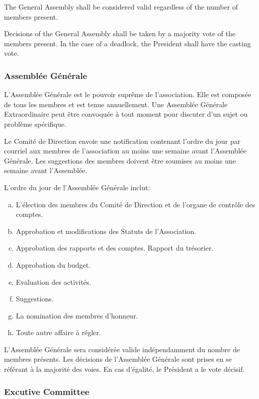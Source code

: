 \documentclass[12pt,a4paper,oneside]{article}
\newcounter{art}
\newcommand{\english}{    \switchcolumn[0]\noindent}
\newcommand{\french}{    \switchcolumn[1]\noindent}
\begin{document}
\begin{paracol}{2}
	The General Assembly shall be considered valid regardless of the number of members present.

	Decisions of the General Assembly shall be taken by a majority vote of the members present. In the case of a deadlock, the President shall have the casting vote.

	\french
	\subsubsection{Assemblée Générale}

	L'Assemblée Générale est le pouvoir suprême de l'association. Elle est composée de tous les membres et est tenue annuellement. Une Assemblée Générale Extraordinaire peut être convoquée à tout moment pour discuter d'un sujet ou problème spécifique.
 
	Le Comité de Direction envoie une notification contenant l’ordre du jour par courriel aux membres de l’association au moins une semaine avant l’Assemblée Générale. Les suggestions des membres doivent être soumises au moins une semaine avant l’Assemblée. 

	L’ordre du jour de l’Assemblée Générale inclut:
	\begin{enumerate}[(a)]
		\item L’élection des membres du Comité de Direction et de l’organe de contrôle des comptes.
		\item Approbation et modifications des Statuts de l’Association.
		\item Approbation des rapports et des comptes. Rapport du trésorier.
		\item Approbation du budget.
		\item Evaluation des activités.
		\item Suggestions.
		\item La nomination des membres d’honneur.
		\item Toute autre affaire à régler.
	\end{enumerate}

	L’Assemblée Générale sera considérée valide indépendamment du nombre de membres présents. Les décisions de l’Assemblée Générale sont prises en se référant à la majorité des voies. En cas d’égalité, le Président a le vote décisif.
	\vspace{1cm}


	\english
	\subsubsection{Excutive Committee}


\end{paracol}
\end{document}
